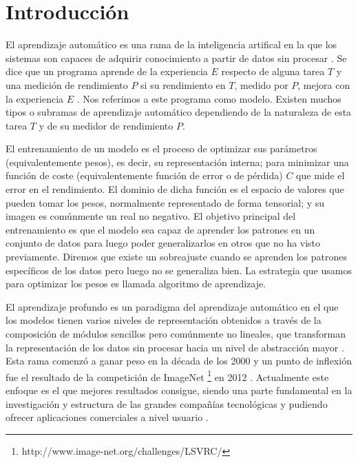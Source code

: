 \section{Introducción}

El aprendizaje automático es una rama de la inteligencia artifical en la que los sistemas son capaces de adquirir conocimiento a partir de datos sin procesar \cite{GoodFellowBook}. Se dice que un programa aprende de la experiencia $E$ respecto de alguna tarea $T$ y una medición de rendimiento $P$ si su rendimiento en $T$, medido por $P$, mejora con la experiencia $E$ \cite{mitchell1997machine}. Nos referimos a este programa como modelo. Existen muchos tipos o subramas de aprendizaje automático dependiendo de la naturaleza de esta tarea $T$ y de su medidor de rendimiento $P$. 

El entrenamiento de un modelo es el proceso de optimizar sus parámetros (equivalentemente pesos), es decir, su representación interna; para minimizar una función de coste (equivalentemente función de error o de pérdida) $C$ que mide el error en el rendimiento. El dominio de dicha función es el espacio de valores que pueden tomar los pesos, normalmente representado de forma tensorial; y su imagen es comúnmente un real no negativo. El objetivo principal del entrenamiento es que el modelo sea capaz de aprender los patrones en un conjunto de datos para luego poder generalizarlos en otros que no ha visto previamente. Diremos que existe un sobreajuste cuando se aprenden los patrones específicos de los datos pero luego no se generaliza bien. La estrategia que usamos para optimizar los pesos es llamada algoritmo de aprendizaje.

El aprendizaje profundo es un paradigma del aprendizaje automático en el que los modelos tienen varios niveles de representación obtenidos a través de la composición de módulos sencillos pero comúnmente no lineales, que transforman la representación de los datos sin procesar hacia un nivel de abstracción mayor \cite{lecun2015deep}. Esta rama comenzó a ganar peso en la década de los 2000 y un punto de inflexión fue el resultado de la competición de ImageNet \footnote{http://www.image-net.org/challenges/LSVRC/} en 2012 \cite{NIPS2012_c399862d}. Actualmente este enfoque es el que mejores resultados consigue, siendo una parte fundamental en la investigación y estructura de las grandes compañías tecnológicas y pudiendo ofrecer aplicaciones comerciales a nivel usuario \cite{Sejnowski18, lecunnDeepForAI}.

